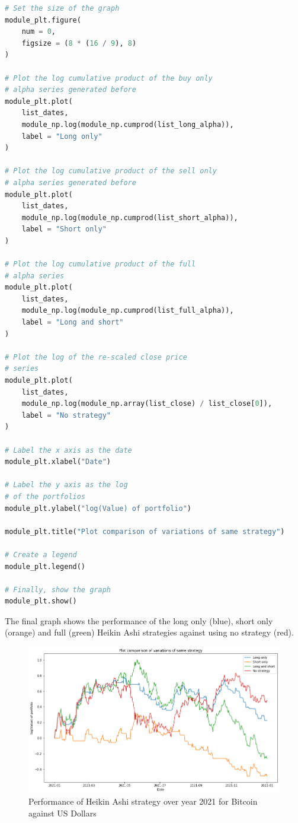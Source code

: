 \documentclass[11pt]{article}
\begin{document}
\begin{lstlisting}[language=Python]
# Set the size of the graph
module_plt.figure(
    num = 0,
    figsize = (8 * (16 / 9), 8)
)

# Plot the log cumulative product of the buy only 
# alpha series generated before
module_plt.plot(
    list_dates,
    module_np.log(module_np.cumprod(list_long_alpha)),
    label = "Long only"
)

# Plot the log cumulative product of the sell only 
# alpha series generated before
module_plt.plot(
    list_dates,
    module_np.log(module_np.cumprod(list_short_alpha)),
    label = "Short only"
)

# Plot the log cumulative product of the full 
# alpha series
module_plt.plot(
    list_dates,
    module_np.log(module_np.cumprod(list_full_alpha)),
    label = "Long and short"
)

# Plot the log of the re-scaled close price
# series
module_plt.plot(
    list_dates,
    module_np.log(module_np.array(list_close) / list_close[0]),
    label = "No strategy"
)

# Label the x axis as the date
module_plt.xlabel("Date")

# Label the y axis as the log
# of the portfolios
module_plt.ylabel("log(Value) of portfolio")

module_plt.title("Plot comparison of variations of same strategy")

# Create a legend
module_plt.legend()

# Finally, show the graph
module_plt.show()
\end{lstlisting}

The final graph shows the performance of the long only (blue), short only (orange) and full (green) Heikin Ashi strategies against using no strategy (red).

\begin{figure}[H]
\centering
    \includegraphics[width=1\linewidth]{images/trade_strat_performance.png}
    \caption{Performance of Heikin Ashi strategy over year 2021 for Bitcoin against US Dollars}
\end{figure}
\end{document}
